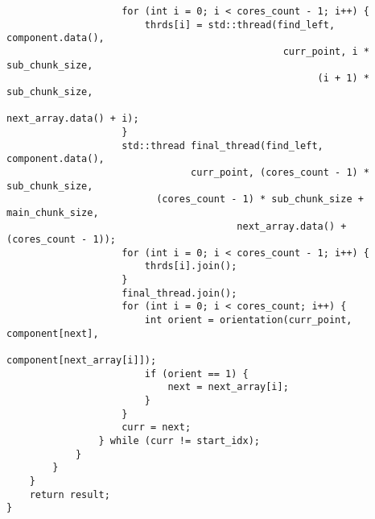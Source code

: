 \documentclass{report}
\begin{document}
\begin{lstlisting}
                    for (int i = 0; i < cores_count - 1; i++) {
                        thrds[i] = std::thread(find_left, component.data(),
                                                curr_point, i * sub_chunk_size,
                                                      (i + 1) * sub_chunk_size,
                                                        next_array.data() + i);
                    }
                    std::thread final_thread(find_left, component.data(),
                                curr_point, (cores_count - 1) * sub_chunk_size,
                          (cores_count - 1) * sub_chunk_size + main_chunk_size,
                                        next_array.data() + (cores_count - 1));
                    for (int i = 0; i < cores_count - 1; i++) {
                        thrds[i].join();
                    }
                    final_thread.join();
                    for (int i = 0; i < cores_count; i++) {
                        int orient = orientation(curr_point, component[next],
                                                     component[next_array[i]]);
                        if (orient == 1) {
                            next = next_array[i];
                        }
                    }
                    curr = next;
                } while (curr != start_idx);
            }
        }
    }
    return result;
}


\end{lstlisting}
\end{document}
